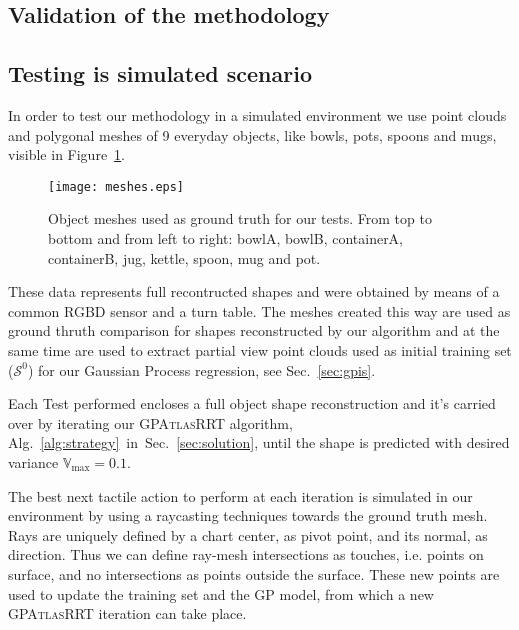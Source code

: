 \subsection{Validation of the methodology}

\subsection{Testing is simulated scenario}\label{sec:synth}
In order to test our methodology in a simulated environment we use point clouds and
polygonal meshes of 9 everyday objects, like bowls, pots, spoons and mugs, visible
in Figure~\ref{fig:meshes}.
\begin{figure}[htb]
    \centering
    \texttt{[image: meshes.eps]}
    \caption{Object meshes used as ground truth for our tests. From top to bottom and from left
    to right: bowlA, bowlB, containerA, containerB, jug, kettle, spoon, mug and pot.}
    \label{fig:meshes}
\end{figure}
These data represents full recontructed shapes and were obtained by means of a common
RGBD sensor and a turn table. The meshes created this way are used as ground thruth 
comparison for shapes reconstructed by our algorithm and at the same time 
are used to extract  partial view point clouds used as initial training
set ($\mathcal{S}^0$) for our Gaussian Process regression, see Sec.~\ref{sec:gpis}.

Each Test performed encloses a full object shape reconstruction and it's carried over
by iterating our \textsc{GPAtlasRRT} algorithm, Alg.~\ref{alg:strategy}~in~Sec.~\ref{sec:solution},
until the shape is predicted with desired variance $\mathbb{V}_{\max} = 0.1$.

The best next tactile action to perform at each iteration is simulated in our
environment by using a raycasting techniques towards the ground truth mesh.
Rays are uniquely defined by a chart center, as pivot point, and its normal, as direction.
Thus we can define  ray-mesh intersections as touches, i.e. points on surface, and no intersections
as points outside the surface. These new points are used to update the training set
and the GP model, from which a new \textsc{GPAtlasRRT} iteration can take place. 

